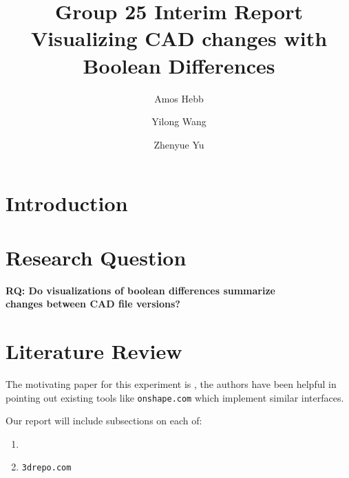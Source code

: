 \documentclass[sigconf,authorversion,nonacm]{acmart}
\begin{document}
\title{Group 25 Interim Report\\Visualizing CAD changes with Boolean Differences}

\author{Amos Hebb}
\author{Yilong Wang}
\author{Zhenyue Yu}
\makeatletter
\def\@ACM@checkaffil{%
	\if@ACM@instpresent\else
		\ClassWarningNoLine{\@classname}{No institution present for an affiliation}%
	\fi
	\if@ACM@citypresent\else
		\ClassWarningNoLine{\@classname}{No city present for an affiliation}%
	\fi
	\if@ACM@countrypresent\else
		\ClassWarningNoLine{\@classname}{No country present for an affiliation}%
	\fi
}
\makeatother

\maketitle

\section{Introduction}

\section{Research Question}

\textbf{RQ: Do visualizations of boolean differences summarize\\changes between CAD file versions?}

\section{Literature Review}

The motivating paper for this experiment is \citet{cheng2023age}, the authors have been helpful in pointing out existing tools like \texttt{onshape.com} which implement similar interfaces.

Our report will include subsections on each of:

\begin{enumerate}
	\item \citet{cheng2023age}
	\item {\texttt{3drepo.com}}
\end{enumerate}
\end{document}
